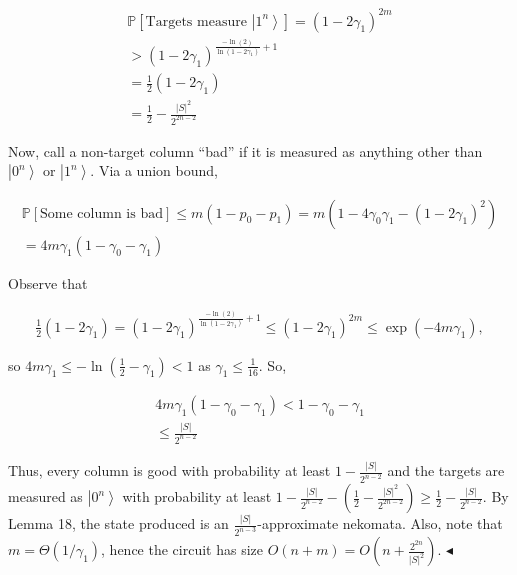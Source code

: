\[\begin{gathered}
\displaystyle\mathbb{P}[\text{Targets measure }\left|1^{n}\right\rangle] \displaystyle=(1-2\gamma_{1})^{2m} \\
\displaystyle>(1-2\gamma_{1})^{\frac{-\ln(2)}{\ln(1-2\gamma_{1})}+1} \\
\displaystyle=\frac{1}{2}(1-2\gamma_{1}) \\
\displaystyle=\frac{1}{2}-\frac{|S|^{2}}{2^{2n-2}}
\end{gathered}\]


Now, call a non-target column “bad” if it is measured as anything other than $\left|0^{n}\right\rangle$ or $\left|1^{n}\right\rangle$. Via a union bound,\par


\[\begin{gathered}
\displaystyle\mathbb{P}[\text{Some column is bad}]\leq m(1-p_{0}-p_{1}) \displaystyle=m(1-4\gamma_{0}\gamma_{1}-(1-2\gamma_{1})^{2}) \\
\displaystyle=4m\gamma_{1}(1-\gamma_{0}-\gamma_{1})
\end{gathered}\]


Observe that\par


\[\begin{gathered}
\frac{1}{2}(1-2\gamma_{1})=(1-2\gamma_{1})^{\frac{-\ln(2)}{\ln(1-2\gamma_{1})}+1}\leq(1-2\gamma_{1})^{2m}\leq\exp(-4m\gamma_{1}),
\end{gathered}\]


so $4m\gamma_{1}\leq-\ln(\frac{1}{2}-\gamma_{1})<1$ as $\gamma_{1}\leq\frac{1}{16}$. So,\par


\[\begin{gathered}
\displaystyle 4m\gamma_{1}(1-\gamma_{0}-\gamma_{1}) \displaystyle<1-\gamma_{0}-\gamma_{1} \\
\displaystyle\leq\frac{|S|}{2^{n-2}}
\end{gathered}\]


Thus, every column is good with probability at least $1-\frac{|S|}{2^{n-2}}$ and the targets are measured as $\left|0^{n}\right\rangle$ with probability at least $1-\frac{|S|}{2^{n-2}}-(\frac{1}{2}-\frac{|S|^{2}}{2^{2n-2}})\geq\frac{1}{2}-\frac{|S|}{2^{n-2}}$. By Lemma 18, the state produced is an $\frac{|S|}{2^{n-3}}$-approximate nekomata. Also, note that $m=\Theta(1/\gamma_{1})$, hence the circuit has size $O(n+m)=O(n+\frac{2^{2n}}{|S|^{2}})$.
$\blacktriangleleft$\par




